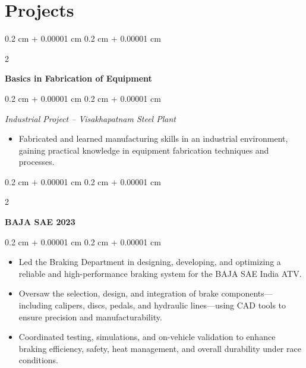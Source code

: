 \documentclass[10pt, letterpaper]{article}
\newenvironment{highlights}{
    \begin{itemize}[
        topsep=0.10 cm,
        parsep=0.10 cm,
        partopsep=0pt,
        itemsep=0pt,
        leftmargin=0.4 cm + 10pt
    ]
}{
    \end{itemize}
} %
\newenvironment{onecolentry}{
    \begin{adjustwidth}{
        0.2 cm + 0.00001 cm
    }{
        0.2 cm + 0.00001 cm
    }
}{
    \end{adjustwidth}
} %
\newenvironment{twocolentry}[2][]{
    \onecolentry
    \def\secondColumn{#2}
    \setcolumnwidth{\fill, 4.5 cm}
    \begin{paracol}{2}
}{
    \switchcolumn \raggedleft \secondColumn
    \end{paracol}
    \endonecolentry
} %
\begin{document}
    \section{Projects}
    \begin{twocolentry}{}
        \textbf{Basics in Fabrication of Equipment}
    \end{twocolentry}
    \vspace{0.10 cm}
    \begin{onecolentry}
        \textit{Industrial Project – Visakhapatnam Steel Plant}
        \begin{highlights}
            \item Fabricated and learned manufacturing skills in an industrial environment, gaining practical knowledge in equipment fabrication techniques and processes.
        \end{highlights}
    \end{onecolentry}

    \vspace{0.2 cm}
    \begin{twocolentry}{}
        \textbf{BAJA SAE 2023}
    \end{twocolentry}
    \vspace{0.10 cm}
    \begin{onecolentry}
        \begin{highlights}
            \item Led the Braking Department in designing, developing, and optimizing a reliable and high-performance braking system for the BAJA SAE India ATV.
            \item Oversaw the selection, design, and integration of brake components---including calipers, discs, pedals, and hydraulic lines---using CAD tools to ensure precision and manufacturability.
            \item Coordinated testing, simulations, and on-vehicle validation to enhance braking efficiency, safety, heat management, and overall durability under race conditions.
        \end{highlights}
    \end{onecolentry}
\end{document}
